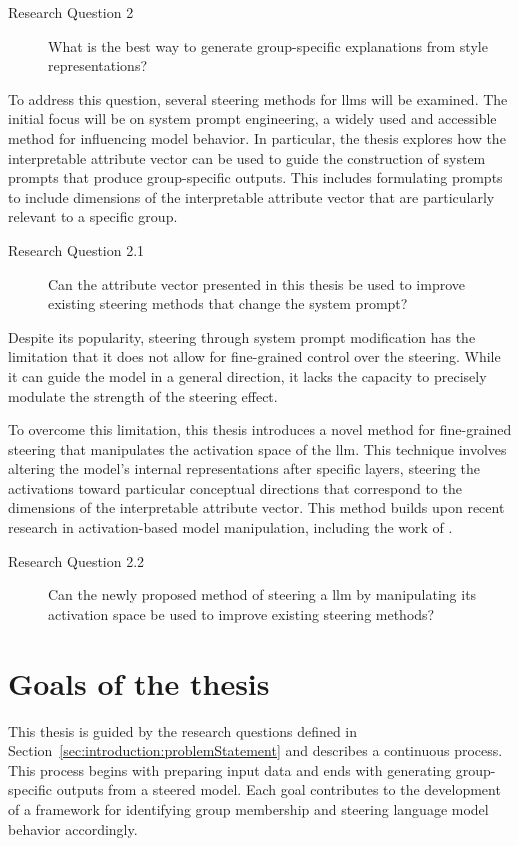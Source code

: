 \begin{description}
  \item[Research Question 2] What is the best way to generate group-specific explanations from style representations?
\end{description}

To address this question, several steering methods for \acp{llm} will be examined. The initial focus will be on system prompt engineering, a widely used and accessible method for influencing model behavior. In particular, the thesis explores how the interpretable attribute vector can be used to guide the construction of system prompts that produce group-specific outputs. This includes formulating prompts to include dimensions of the interpretable attribute vector that are particularly relevant to a specific group.

\begin{description}
  \item[Research Question 2.1] Can the attribute vector presented in this thesis be used to improve existing steering methods that change the system prompt?
\end{description}

Despite its popularity, steering through system prompt modification has the limitation that it does not allow for fine-grained control over the steering. While it can guide the model in a general direction, it lacks the capacity to precisely modulate the strength of the steering effect.

To overcome this limitation, this thesis introduces a novel method for fine-grained steering that manipulates the activation space of the \ac{llm}. This technique involves altering the model's internal representations after specific layers, steering the activations toward particular conceptual directions that correspond to the dimensions of the interpretable attribute vector. This method builds upon recent research in activation-based model manipulation, including the work of \citet{konenStyleVectorsSteering2024,turnerActivationAdditionSteering2024,rimsky-etal-2024-steering}.

\begin{description}
  \item[Research Question 2.2] Can the newly proposed method of steering a \ac{llm} by manipulating its activation space be used to improve existing steering methods?
\end{description}


\section{Goals of the thesis}
\label{sec:introduction:goals}
\newlength{\maxstretch}
\setlength{\maxstretch}{0pt plus 1fill}
This thesis is guided by the research questions defined in Section~\ref{sec:introduction:problemStatement} and describes a continuous process. This process begins with preparing input data and ends with generating group-specific outputs from a steered model. Each goal contributes to the development of a framework for identifying group membership and steering language model behavior accordingly.

